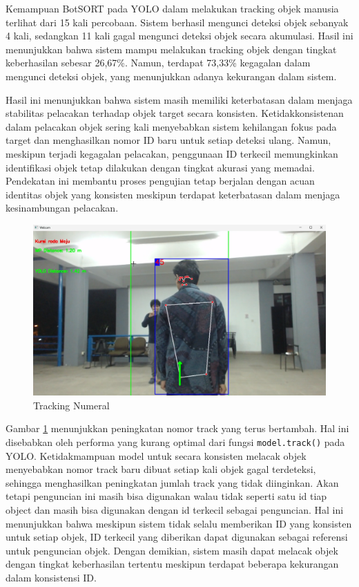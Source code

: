 Kemampuan BotSORT pada YOLO dalam melakukan tracking objek manusia terlihat dari 15 kali percobaan. Sistem berhasil mengunci deteksi objek sebanyak 4 kali, sedangkan 11 kali gagal mengunci deteksi objek secara akumulasi. Hasil ini menunjukkan bahwa sistem mampu melakukan tracking objek dengan tingkat keberhasilan sebesar 26,67\%. Namun, terdapat 73,33\% kegagalan dalam mengunci deteksi objek, yang menunjukkan adanya kekurangan dalam sistem.

Hasil ini menunjukkan bahwa sistem masih memiliki keterbatasan dalam menjaga stabilitas pelacakan terhadap objek target secara konsisten. Ketidakkonsistenan dalam pelacakan objek sering kali menyebabkan sistem kehilangan fokus pada target dan menghasilkan nomor ID baru untuk setiap deteksi ulang. Namun, meskipun terjadi kegagalan pelacakan, penggunaan ID terkecil memungkinkan identifikasi objek tetap dilakukan dengan tingkat akurasi yang memadai. Pendekatan ini membantu proses pengujian tetap berjalan dengan acuan identitas objek yang konsisten meskipun terdapat keterbatasan dalam menjaga kesinambungan pelacakan.

\begin{figure}[H]
    \centering
  
    \includegraphics[scale=0.4]{gambar/Track.png}

    \caption{Tracking Numeral}
    \label{fig:tracking_numeral}
\end{figure}

Gambar \ref{fig:tracking_numeral} menunjukkan peningkatan nomor track yang terus bertambah. Hal ini disebabkan oleh performa yang kurang optimal dari fungsi \texttt{model.track()} pada YOLO. Ketidakmampuan model untuk secara konsisten melacak objek menyebabkan nomor track baru dibuat setiap kali objek gagal terdeteksi, sehingga menghasilkan peningkatan jumlah track yang tidak diinginkan. 
Akan tetapi penguncian ini masih bisa digunakan walau tidak seperti satu id tiap object dan masih bisa digunakan dengan id terkecil sebagai penguncian. Hal ini menunjukkan bahwa meskipun sistem tidak selalu memberikan ID yang konsisten untuk setiap objek, ID terkecil yang diberikan dapat digunakan sebagai referensi untuk penguncian objek. Dengan demikian, sistem masih dapat melacak objek dengan tingkat keberhasilan tertentu meskipun terdapat beberapa kekurangan dalam konsistensi ID.


